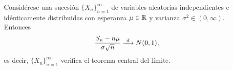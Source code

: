 \documentclass[a4paper, 11pt, extrafontsizes]{memoir}
\begin{document}
\begin{theorem}
    Considérese una sucesión $\{X_n\}_{n=1}^\infty$ de variables aleatorias independientes e idénticamente distribuidas con esperanza $\mu \in \mathbb R$ y varianza $\sigma^2 \in (0,\infty)$. Entonces
    \[\frac{S_n - n\mu}{\sigma \sqrt{n}} \dconv N(0,1),\]
    es decir, $\{X_n\}_{n=1}^\infty$ verifica el teorema central del límite.
\end{theorem}
\end{document}
